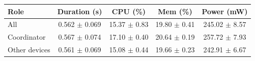 \begin{tabular}{lcccc}
\hline
\textbf{Role} & \textbf{Duration (s)} & \textbf{CPU (\%)} & \textbf{Mem (\%)} & \textbf{Power (mW)} \\
\hline
All & 0.562 $\pm$ 0.069 & 15.37 $\pm$ 0.83 & 19.80 $\pm$ 0.41 & 245.02 $\pm$ 8.57 \\
Coordinator & 0.567 $\pm$ 0.074 & 17.10 $\pm$ 0.40 & 20.64 $\pm$ 0.19 & 257.72 $\pm$ 7.93 \\
Other devices & 0.561 $\pm$ 0.069 & 15.08 $\pm$ 0.44 & 19.66 $\pm$ 0.23 & 242.91 $\pm$ 6.67 \\
\hline
\end{tabular}
